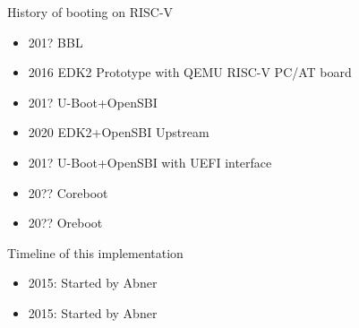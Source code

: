 \documentclass[
  10pt
]{beamer}
\begin{document}

% 

\begin{frame}{History of booting on RISC-V}
  \begin{itemize}
    \item 201? BBL %
    \item 2016 EDK2 Prototype with QEMU RISC-V PC/AT board %
    \item 201? U-Boot+OpenSBI
    \item 2020 EDK2+OpenSBI Upstream
    \item 201? U-Boot+OpenSBI with UEFI interface

    \item 20?? Coreboot
    \item 20?? Oreboot
  \end{itemize}
\end{frame}

\begin{frame}{Timeline of this implementation}
  \begin{itemize}
    \item 2015: Started by Abner
    \item 2015: Started by Abner
  \end{itemize}
\end{frame}

\end{document}
